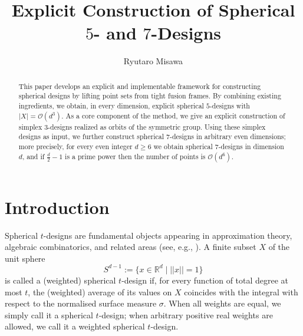\documentclass{amsart}
\title{Explicit Construction of Spherical $5$- and $7$-Designs}
\author[R.~Misawa]{Ryutaro Misawa}
\theoremstyle{definition}
\theoremstyle{remark}
\numberwithin{equation}{section}
\newcommand{\R}{{\mathbb R}}
\newcommand{\order}{\mathcal{O}}
\begin{document}
\begin{abstract}
This paper develops an explicit and implementable framework for constructing spherical designs by lifting point sets from tight fusion frames.
By combining existing ingredients, we obtain, in every dimension, explicit spherical $5$-designs with $|X|=\order(d^3)$.
As a core component of the method, we give an explicit construction of simplex $3$-designs realized as orbits of the symmetric group.
Using these simplex designs as input, we further construct spherical $7$-designs in arbitrary even dimensions; more precisely, for every even integer $d\ge 6$ we obtain spherical $7$-designs in dimension $d$, and if $\frac{d}{2}-1$ is a prime power then the number of points is $\order(d^6)$.


\end{abstract}

\maketitle


\section{Introduction}
Spherical $t$-designs are fundamental objects appearing in approximation theory, algebraic combinatorics, and related areas (see, e.g., \cite{ACSW2010, BB2009}).
A finite subset $X$ of the unit sphere 
\[S^{d-1}:=\{x\in \R^d \mid || x||=1\}\]
is called a (weighted) spherical $t$-design if, for every function of total degree at most $t$, the (weighted) average of its values on $X$ coincides with the integral with respect to the normalised surface measure $\sigma$.
When all weights are equal, we simply call it a spherical $t$-design; when arbitrary positive real weights are allowed, we call it a weighted spherical $t$-design.
\end{document}

